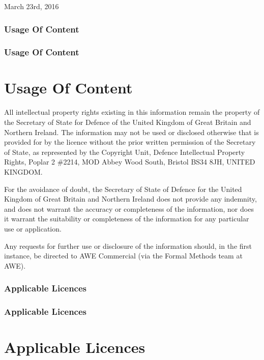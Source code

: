 March 23rd, 2016

\ifplastex
\subsubsection{Usage Of Content}
\label{sec:usage-content}
\else
  \ifstandalone
  \subsubsection{Usage Of Content}
  \label{sec:usage-content}
  \else
  \section{Usage Of Content}
  \label{sec:usage-content}
  \fi
\fi

All intellectual property rights existing in this information remain
the property of the Secretary of State for Defence of the United
Kingdom of Great Britain and Northern Ireland. The information may not
be used or disclosed otherwise that is provided for by the
licence without the prior written permission of the
Secretary of State, as represented by the Copyright Unit, Defence
Intellectual Property Rights, Poplar 2 \#2214, MOD Abbey Wood South,
Bristol BS34 8JH, UNITED KINGDOM.

For the avoidance of doubt, the Secretary of State of Defence for the
United Kingdom of Great Britain and Northern Ireland does not provide
any indemnity, and does not warrant the accuracy or completeness of
the information, nor does it warrant the suitability or completeness
of the information for any particular use or application.

Any requests for further use or disclosure of the information should,
in the first instance, be directed to AWE Commercial (via the Formal
Methods team at AWE).

\ifplastex
\subsubsection{Applicable Licences}
\label{sec:vhdl-applicable-licences}
\else
  \ifstandalone
  \subsubsection{Applicable Licences}
  \label{sec:vhdl-applicable-licences}
  \else
  \section{Applicable Licences}
  \label{sec:vhdl-applicable-licences}
  \fi
\fi
 
